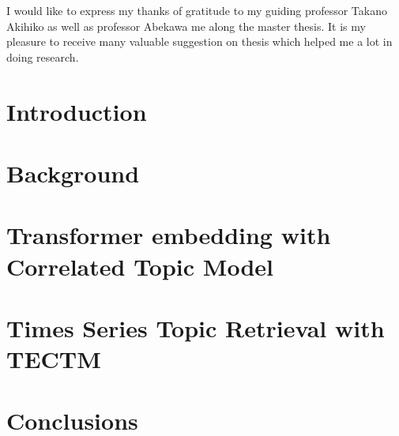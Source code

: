 \documentclass[master,final,11pt]{iscs-thesis}
\date{\today}
\begin{document}
\begin{eabstract}

\end{eabstract}
\begin{jabstract}

\end{jabstract}
\maketitle
\begin{acknowledge}
I would like to express my thanks of gratitude to my guiding professor Takano Akihiko as well as professor Abekawa me along the master thesis. It is my pleasure to receive many valuable suggestion on thesis which helped me a lot in doing research.
\end{acknowledge}
\frontmatter
\tableofcontents
\listoffigures
\listoftables
\listofalgorithms
\mainmatter %
\titlepage
\chapter{Introduction}\label{ch1}



\chapter{Background}\label{ch2}

%
%
%
\chapter{Transformer embedding with Correlated Topic Model}\label{ch4}



\chapter{Times Series Topic Retrieval with TECTM}\label{ch5}



\chapter{Conclusions}\label{ch6}



%
\end{document}
